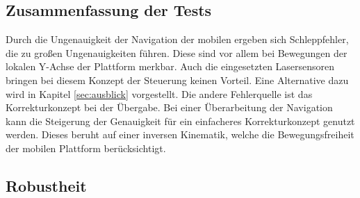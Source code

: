 \subsection{Zusammenfassung der Tests}
Durch die Ungenauigkeit der Navigation der mobilen ergeben sich Schleppfehler, die zu großen Ungenauigkeiten führen. Diese sind vor allem bei Bewegungen der lokalen Y-Achse der Plattform merkbar. Auch die eingesetzten Lasersensoren bringen bei diesem Konzept der Steuerung keinen Vorteil. Eine Alternative dazu wird in Kapitel \ref{sec:ausblick} vorgestellt. Die andere Fehlerquelle ist das Korrekturkonzept bei der Übergabe. Bei einer Überarbeitung der Navigation kann die Steigerung der Genauigkeit für ein einfacheres Korrekturkonzept genutzt werden. Dieses beruht auf einer inversen Kinematik, welche die Bewegungsfreiheit der mobilen Plattform berücksichtigt.

\subsection{Robustheit}